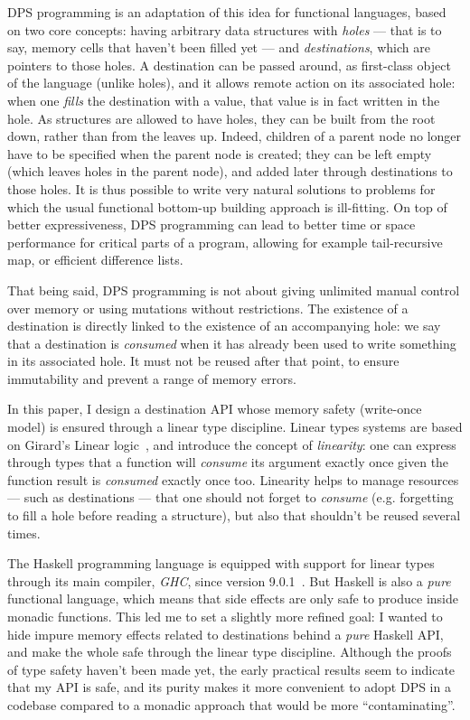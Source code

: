\documentclass[english]{jflart}
\begin{document}
DPS programming is an adaptation of this idea for functional languages, based on two core concepts: having arbitrary data structures with \emph{holes} --- that is to say, memory cells that haven't been filled yet --- and \emph{destinations}, which are pointers to those holes. A destination can be passed around, as first-class object of the language (unlike holes), and it allows remote action on its associated hole: when one \emph{fills} the destination with a value, that value is in fact written in the hole. As structures are allowed to have holes, they can be built from the root down, rather than from the leaves up. Indeed, children of a parent node no longer have to be specified when the parent node is created; they can be left empty (which leaves holes in the parent node), and added later through destinations to those holes. It is thus possible to write very natural solutions to problems for which the usual functional bottom-up building approach is ill-fitting. On top of better expressiveness, DPS programming can lead to better time or space performance for critical parts of a program, allowing for example tail-recursive map, or efficient difference lists.

That being said, DPS programming is not about giving unlimited manual control over memory or using mutations without restrictions. The existence of a destination is directly linked to the existence of an accompanying hole: we say that a destination is \emph{consumed} when it has already been used to write something in its associated hole. It must not be reused after that point, to ensure immutability and prevent a range of memory errors.

In this paper, I design a destination API whose memory safety (write-once model) is ensured through a linear type discipline. Linear types systems are based on Girard's Linear logic~\cite{girard_linear_1995}, and introduce the concept of \emph{linearity}: one can express through types that a function will \emph{consume} its argument exactly once given the function result is \emph{consumed} exactly once too. Linearity helps to manage resources --- such as destinations --- that one should not forget to \emph{consume} (e.g. forgetting to fill a hole before reading a structure), but also that shouldn't be reused several times.

The Haskell programming language is equipped with support for linear types through its main compiler, \emph{GHC}, since version 9.0.1~\cite{bernardy_linear_2018}. But Haskell is also a \emph{pure} functional language, which means that side effects are only safe to produce inside monadic functions. This led me to set a slightly more refined goal: I wanted to hide impure memory effects related to destinations behind a \emph{pure} Haskell API, and make the whole safe through the linear type discipline. Although the proofs of type safety haven't been made yet, the early practical results seem to indicate that my API is safe, and its purity makes it more convenient to adopt DPS in a codebase compared to a monadic approach that would be more ``contaminating''.
\end{document}
